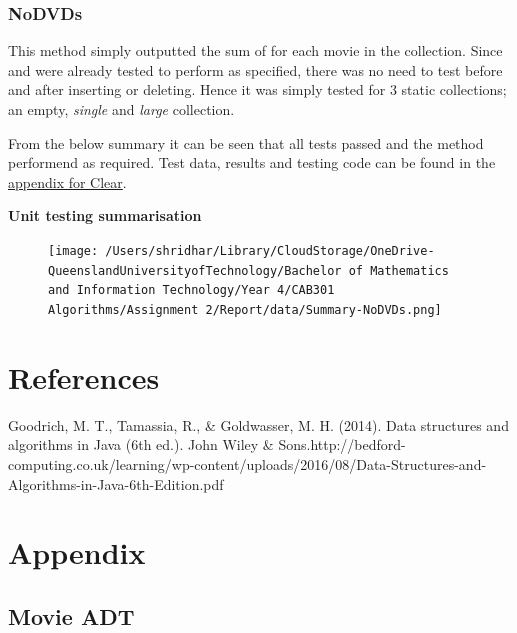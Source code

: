 \documentclass[a4paper]{article}
\begin{document}
\subsubsection{NoDVDs}
This method simply outputted the sum of  for each movie in the collection. Since  and  were already tested to perform as specified, there was no need to test  before and after inserting or deleting. Hence it was simply tested for 3 static collections; an empty, \textit{single} and \textit{large} collection.
\vspace{1mm}

\noindent
From the below summary it can be seen that all tests passed and the method performend as required. Test data, results and testing code can be found in the \hyperlink{subsubsection.5.2.7}{appendix for Clear}.
\vspace{2mm}

\noindent
\textbf{Unit testing summarisation}
\begin{figure}[H]
   \texttt{[image: /Users/shridhar/Library/CloudStorage/OneDrive-QueenslandUniversityofTechnology/Bachelor of Mathematics and Information Technology/Year 4/CAB301 Algorithms/Assignment 2/Report/data/Summary-NoDVDs.png]}
\end{figure}


\section{References}

Goodrich, M. T., Tamassia, R., \& Goldwasser, M. H. (2014). Data structures and algorithms in Java (6th ed.). John Wiley \& Sons.http://bedford-computing.co.uk/learning/wp-content/uploads/2016/08/Data-Structures-and-Algorithms-in-Java-6th-Edition.pdf
\pagebreak

\section{Appendix}

\subsection{Movie ADT}
\end{document}
